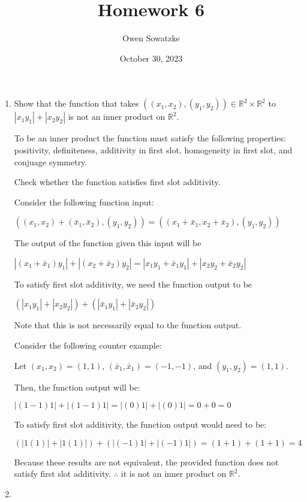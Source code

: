 \documentclass[fleqn]{article}
\title{Homework 6}
\author{Owen Sowatzke}
\date{October 30, 2023}
\newcommand{\zerodisplayskip}{
	\setlength{\abovedisplayskip}{0pt}%
	\setlength{\belowdisplayskip}{0pt}%
	\setlength{\abovedisplayshortskip}{0pt}%
	\setlength{\belowdisplayshortskip}{0pt}%
	\setlength{\mathindent}{0pt}}
\begin{document}
	\offinterlineskip
	\setlength{\lineskip}{12pt}
	\zerodisplayskip
	\maketitle
	
	\begin{enumerate}[nolistsep]
		\item Show that the function that takes $((x_1, x_2),(y_1,y_2)) \in \mathbb{R}^2 \times \mathbb{R}^2$ to \newline $|x_1y_1| + |x_2y_2|$ is not an inner product on $\mathbb{R}^2$.
		
			To be an inner product the function must satisfy the following properties: positivity, definiteness, additivity in first slot, homogeneity in first slot, and conjuage symmetry.
			
			Check whether the function satisfies first slot additivity.
			
			Consider the following function input:
			
			$((x_1, x_2) + (\bar{x}_1, \bar{x}_2),(y_1,y_2)) = ((x_1 + \bar{x}_1, x_2 + \bar{x}_2),(y_1,y_2))$
			
			The output of the function given this input will be
			
			$|(x_1 + \bar{x}_1)y_1| + |(x_2 + \bar{x}_2)y_2| = |x_1y_1 + \bar{x}_1y_1| + |x_2y_2 + \bar{x}_2y_2|$
			
			To satisfy first slot additivity, we need the function output to be
			
			$(|x_1y_1| + |x_2y_2|) + (|\bar{x}_1y_1| + |\bar{x}_2y_2|)$
			
			Note that this is not necessarily equal to the function output.
			
			Consider the following counter example:
			
			Let $(x_1,x_2) = (1,1)$, $(\bar{x}_1,\bar{x}_1) = (-1,-1)$, and $(y_1,y_2) = (1,1)$.
			
			Then, the function output will be:
			
			$|(1 - 1)1| + |(1 - 1)1| = |(0)1| + |(0)1| = 0 + 0 = 0$
			
			To satisfy first slot additivity, the function output would need to be:
			
			$(|1(1)| + |1(1)|) + (|(-1)1| + |(-1)1|) = (1 + 1) + (1 + 1) = 4$
			
			Because these results are not equivalent, the provided function does not satisfy first slot additivity. $\therefore$ it is not an inner product on $\mathbb{R}^2$.
			
		\item 
	\end{enumerate}
\end{document}

